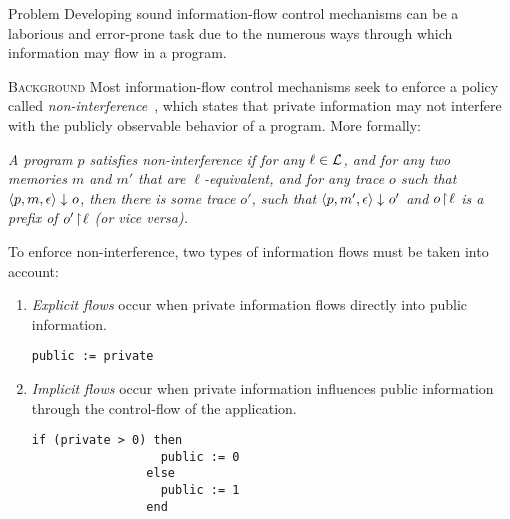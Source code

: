 \documentclass[final]{beamer}
\newlength{\onecolwid}
\begin{document}
\begin{frame}[fragile]
\begin{columns}[t]
\begin{column}{\onecolwid}
\begin{alertblock}{Problem}
    Developing sound information-flow control mechanisms can be a laborious and error-prone task due to the numerous ways through which information may flow in a program.
\end{alertblock}

\begin{block}{\textsc{Background}}
    Most information-flow control mechanisms seek to enforce a policy called \emph{non-interference}~\cite{DBLP:conf/sp/GoguenM82a}, which states that private information may not interfere with the publicly observable behavior of a program. More formally:
    \vspace{-0.31cm}
    \begin{alertblock}{}
        \textit{A program $p$ satisfies non-interference if for any $\ell \in {\cal L}$, and for any two memories $m$ and $m'$ that are $\ell$-equivalent, and for any trace $o$ such that $\langle p, m, \epsilon \rangle\downarrow_{}o $, then there is some trace $o'$, such that $\langle p, m', \epsilon \rangle\downarrow_{}o'$ and ${o \! \upharpoonright \! {\ell}}$ is a prefix of ${o' \! \upharpoonright \! {\ell}}$ (or vice versa).}
    \end{alertblock}
    \vspace{-1cm}
    \color{black}
    
    
    To enforce non-interference, two types of information flows must be taken into account: 
    \begin{enumerate}
        \item{\emph{Explicit flows} occur when private information flows directly into public information.
            \begin{lstlisting}[label=listing:explicit-flow,gobble=15]
                public := private
            \end{lstlisting}} 
        \item{\emph{Implicit flows} occur when private information influences public information through the control-flow of the application.
            \begin{lstlisting}[label=listing:implicit-flow,gobble=15]
                if (private > 0) then
                  public := 0
                else
                  public := 1
                end
            \end{lstlisting}}
    \end{enumerate}
\end{block}



\end{column}
\end{columns}
\end{frame}
\end{document}
